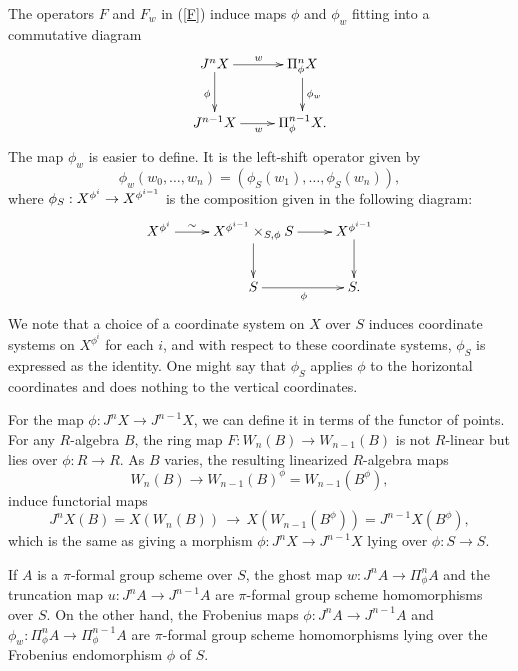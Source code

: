 \documentclass{amsart}
\numberwithin{equation}{section}
\newcommand{\longmap}{{\,\longrightarrow\,}}
\begin{document}
The operators $F$ and $F_w$ in (\ref{F}) induce maps $\phi$ and $\phi_w$ fitting into a commutative diagram
\begin{equation}
        \label{phiw}
        \xymatrix{
        J^nX \ar[r]^w\ar[d]_{\phi} & \Pi_{\phi}^n X \ar[d]^{\phi_w}\\
        J^{n-1}X \ar[r]_w & \Pi_{\phi}^{n-1} X.
        }
\end{equation}
The map $\phi_w$ is easier to define. It is the left-shift operator given by
        $$
        \phi_w(w_0,\dots,w_n)= (\phi_S(w_1),\dots,\phi_S(w_n)),
        $$
where  $\phi_S:X^{\phi^i} \rightarrow X^{\phi^{i-1}}$ is the composition given in the following diagram:
\begin{equation}
        \label{ko}
        \xymatrix{
        X^{\phi^i}\ar[r]^-{\sim} & X^{\phi^{i-1}} \times_{S,\phi} S \ar[d] 
        \ar[r]^-{} & 
        X^{\phi^{i-1}} \ar[d] \\
        & S \ar[r]_{\phi} & S.
        }
\end{equation}
We note that a choice of a coordinate system on $X$ over $S$ induces coordinate systems on
$X^{\phi^i}$ for each $i$, and with respect to these coordinate systems,
$\phi_S$ is expressed as the identity. One might say that $\phi_S$
applies $\phi$ to the horizontal coordinates and does nothing to the vertical coordinates.

For the map $\phi:J^nX\to J^{n-1}X$, we can define it in terms of the functor of points.
For any $R$-algebra $B$, the ring map $F:W_n(B)\to W_{n-1}(B)$ is not $R$-linear
but lies over $\phi:R\to R$. As $B$ varies, the resulting linearized $R$-algebra maps
  $$
        W_n(B)\to W_{n-1}(B)^{\phi} = W_{n-1}(B^{\phi}),
        $$
induce functorial maps
\begin{equation}
        J^nX(B) = X(W_n(B)) \longmap X(W_{n-1}(B^{\phi})) = J^{n-1}X(B^{\phi}),
\end{equation}
which is the same as giving a morphism $\phi:J^n X\to J^{n-1}X$ lying over $\phi:S\to S$.

If $A$ is a $\pi$-formal group scheme over $S$,
the ghost map $w:J^nA\to \Pi_{\phi}^n A$ and the truncation map
$u:J^nA\to J^{n-1}A$
are $\pi$-formal group scheme homomorphisms over $S$.
On the other hand, the Frobenius maps $\phi:J^nA\to J^{n-1}A$ and $\phi_w:\Pi_{\phi}^nA \to \Pi_{\phi}^{n-1}A$
are $\pi$-formal group scheme homomorphisms lying over
the Frobenius endomorphism $\phi$ of $S$.
\end{document}
